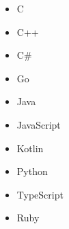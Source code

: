 \documentclass[preview]{standalone}
\begin{document}
\begin{center}
\begin{itemize}
                                \item C
                                \item C++
                                \item C\#
                                \item Go
                                \item Java
                                \item JavaScript
                                \item Kotlin
                                \item Python
                                \item TypeScript
                                \item Ruby
                            \end{itemize}
\end{center}
\end{document}

